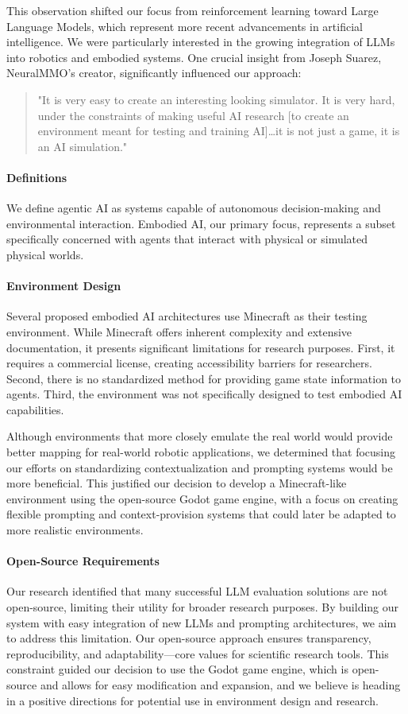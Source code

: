\documentclass{article}
\begin{document}
This observation shifted our focus from reinforcement learning toward Large Language Models, which represent more recent advancements in artificial intelligence.
We were particularly interested in the growing integration of LLMs into robotics and embodied systems.
One crucial insight from Joseph Suarez, NeuralMMO's creator, significantly influenced our approach:
\begin{quote}
    "It is very easy to create an interesting looking simulator. It is very hard, under the constraints of making useful AI research [to create an environment meant for testing and training AI]…it is not just a game, it is an AI simulation."
\end{quote}

\paragraph{Definitions}
We define agentic AI as systems capable of autonomous decision-making and environmental interaction.
Embodied AI, our primary focus, represents a subset specifically concerned with agents that interact with physical or simulated physical worlds.

\paragraph{Environment Design}
Several proposed embodied AI architectures use Minecraft as their testing environment.
While Minecraft offers inherent complexity and extensive documentation, it presents significant limitations for research purposes.
First, it requires a commercial license, creating accessibility barriers for researchers.
Second, there is no standardized method for providing game state information to agents.
Third, the environment was not specifically designed to test embodied AI capabilities.

Although environments that more closely emulate the real world would provide better mapping for real-world robotic applications, we determined that focusing our efforts on standardizing contextualization and prompting systems would be more beneficial.
This justified our decision to develop a Minecraft-like environment using the open-source Godot game engine, with a focus on creating flexible prompting and context-provision systems that could later be adapted to more realistic environments.

\paragraph{Open-Source Requirements}
Our research identified that many successful LLM evaluation solutions are not open-source, limiting their utility for broader research purposes.
By building our system with easy integration of new LLMs and prompting architectures, we aim to address this limitation.
Our open-source approach ensures transparency, reproducibility, and adaptability—core values for scientific research tools.
This constraint guided our decision to use the Godot game engine, which is open-source and allows for easy modification and expansion, and we believe is heading in a positive directions for potential use in environment design and research.
\end{document}
